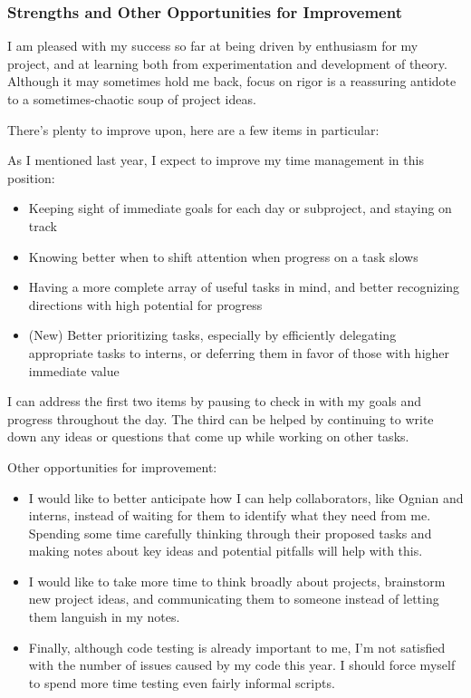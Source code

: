 \documentclass{paper}
\begin{document}
\subsubsection*{Strengths and Other Opportunities for Improvement}

I am pleased with my success so far at being driven by enthusiasm for my project, and at learning both from experimentation and development of theory.
Although it may sometimes hold me back, focus on rigor is a reassuring antidote to a sometimes-chaotic soup of project ideas.

There's plenty to improve upon, here are a few items in particular:

As I mentioned last year, I expect to improve my time management in this position:
\begin{itemize}
    \item Keeping sight of immediate goals for each day or subproject, and staying on track
    \item Knowing better when to shift attention when progress on a task slows
    \item Having a more complete array of useful tasks in mind, and better recognizing directions with high potential for progress
    \item (New) Better prioritizing tasks, especially by efficiently delegating appropriate tasks to interns, or deferring them in favor of those with higher immediate value
\end{itemize}
I can address the first two items by pausing to check in with my goals and progress throughout the day.
The third can be helped by continuing to write down any ideas or questions that come up while working on other tasks.


Other opportunities for improvement:
\begin{itemize}
    \item I would like to better anticipate how I can help collaborators, like Ognian and interns, instead of waiting for them to identify what they need from me.
        Spending some time carefully thinking through their proposed tasks and making notes about key ideas and potential pitfalls will help with this.
    \item I would like to take more time to think broadly about projects, brainstorm new project ideas, and communicating them to someone instead of letting them languish in my notes.
    \item Finally, although code testing is already important to me, I'm not satisfied with the number of issues caused by my code this year.
        I should force myself to spend more time testing even fairly informal scripts.
    
\end{itemize}
\end{document}
